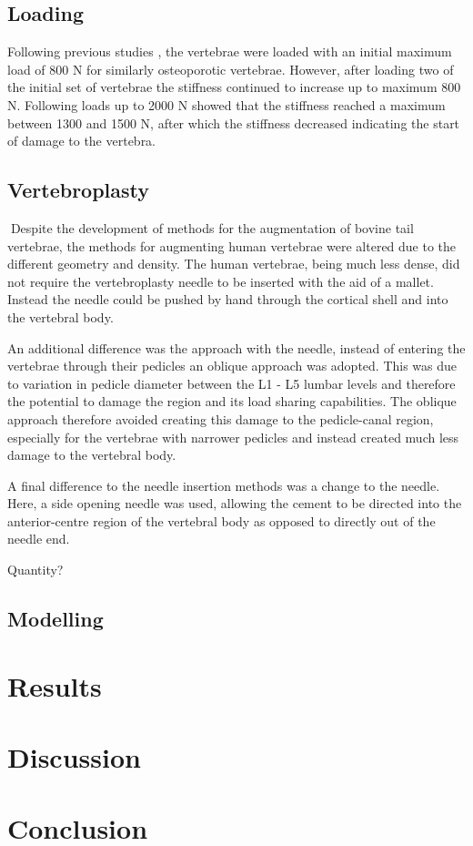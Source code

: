 \subsection{Loading}

Following previous studies \cite{Wijayathunga2008}, the vertebrae were loaded with an initial maximum load of 800 N for similarly osteoporotic vertebrae.
However, after loading two of the initial set of vertebrae the stiffness continued to increase up to maximum 800 N. 
Following loads up to 2000 N showed that the stiffness reached a maximum between 1300 and 1500 N, after which the stiffness decreased indicating the start of damage to the vertebra.


\subsection{Vertebroplasty}

Despite the development of methods for the augmentation of bovine tail vertebrae, the methods for augmenting human vertebrae were altered due to the different geometry and density.
The human vertebrae, being much less dense, did not require the vertebroplasty needle to be inserted with the aid of a mallet.
Instead the needle could be pushed by hand through the cortical shell and into the vertebral body.

An additional difference was the approach with the needle, instead of entering the vertebrae through their pedicles an oblique approach was adopted.
This was due to variation in pedicle diameter between the L1 - L5 lumbar levels and therefore the potential to damage the region and its load sharing capabilities.
The oblique approach therefore avoided creating this damage to the pedicle-canal region, especially for the vertebrae with narrower pedicles and instead created much less damage to the vertebral body.

A final difference to the needle insertion methods was a change to the needle.
Here, a side opening needle was used, allowing the cement to be directed into the anterior-centre region of the vertebral body as opposed to directly out of the needle end.

Quantity?


\subsection{Modelling}

\section{Results}

\section{Discussion}

\section{Conclusion}







